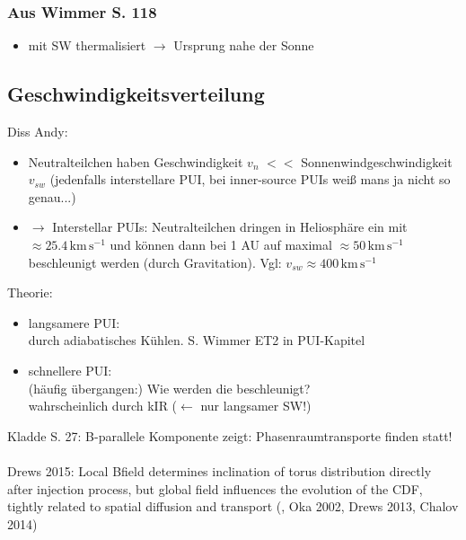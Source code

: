 \documentclass[]{article}
\begin{document}
\subsubsection{Aus Wimmer S. 118}
\begin{itemize}
	\item mit SW thermalisiert $\rightarrow$ Ursprung nahe der Sonne
\end{itemize}
%
%
%
\subsection{Geschwindigkeitsverteilung}
Diss Andy:
\begin{itemize}
	\item Neutralteilchen haben Geschwindigkeit $v_n$ $<<$ Sonnenwindgeschwindigkeit $v_{sw}$ (jedenfalls interstellare PUI, bei inner-source PUIs weiß mans ja nicht so genau...)
	\item $\rightarrow$ Interstellar PUIs: Neutralteilchen dringen in Heliosphäre ein mit $\approx 25.4\,\mathrm{km\,s^{-1}}$ und können dann bei 1 AU auf maximal $\approx 50\,\mathrm{km\,s^{-1}}$ beschleunigt werden (durch Gravitation). Vgl: $v_{sw}\approx 400\,\mathrm{km\,s^{-1}}$
\end{itemize}
Theorie:
\begin{itemize}
	\item langsamere PUI: \\ durch adiabatisches Kühlen. S. Wimmer ET2 in PUI-Kapitel
	\item schnellere PUI: \\
	(häufig übergangen:) Wie werden die beschleunigt?\\
	wahrscheinlich durch kIR ($\leftarrow$ nur langsamer SW!)
\end{itemize}
Kladde S. 27: B-parallele Komponente zeigt: Phasenraumtransporte finden statt!\\ \\
Drews 2015: Local Bfield determines inclination of torus distribution directly after injection process, but global field influences the evolution of the CDF, tightly related to spatial diffusion and transport (\cite{chalov_1998}, Oka 2002, Drews 2013, Chalov 2014)
%
\end{document}

